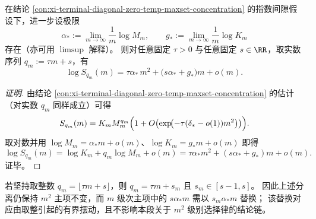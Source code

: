 \begin{conclusion}[双尺度对角矩展开：\texorpdfstring{$q=\tau m+s$}{q=tau m+s} 时 \texorpdfstring{$\log S_q(m)$}{log S_q(m)} 的 \(m^2+m\) 两级主项完全可分离]\label{con:xi-terminal-diagonal-logSq-m2-m-separation}
在结论 \ref{con:xi-terminal-diagonal-zero-temp-maxset-concentration} 的指数间隙假设下，进一步设极限
\[
\alpha_\ast:=\lim_{m\to\infty}\frac{1}{m}\log M_m,\qquad
g_\ast:=\lim_{m\to\infty}\frac{1}{m}\log K_m
\]
存在（亦可用 \(\limsup\) 解释）。
则对任意固定 \(\tau>0\) 与任意固定 \(s\in\RR\)，取实数序列 \(q_m:=\tau m+s\)，有
\[
\log S_{q_m}(m)=\tau\alpha_\ast\,m^2+\bigl(s\alpha_\ast+g_\ast\bigr)m+o(m).
\]
\end{conclusion}
\begin{proof}[证明]
由结论 \ref{con:xi-terminal-diagonal-zero-temp-maxset-concentration} 的估计（对实数 \(q_m\) 同样成立）可得
\[
S_{q_m}(m)=K_m M_m^{q_m}\Bigl(1+O\bigl(\exp\!\bigl(-\tau(\delta_\ast-o(1))m^2\bigr)\bigr)\Bigr).
\]
取对数并用 \(\log M_m=\alpha_\ast m+o(m)\)、\(\log K_m=g_\ast m+o(m)\) 即得
\[
\log S_{q_m}(m)=\log K_m+q_m\log M_m+o(m)
=\tau\alpha_\ast m^2+(s\alpha_\ast+g_\ast)m+o(m).
\]
证毕。
\end{proof}

\begin{remark}[关于整数化 \texorpdfstring{$q_m=\lfloor\tau m+s\rfloor$}{q=floor(tau m+s)} 的次主项]
若坚持取整数 \(q_m=\lfloor\tau m+s\rfloor\)，则 \(q_m=\tau m+s_m\) 且 \(s_m\in[s-1,s]\)。
因此上述分离仍保持 \(m^2\) 主项不变，而 \(m\) 级次主项中的 \(s\alpha_\ast m\) 需以 \(s_m\alpha_\ast m\) 替换；
该替换对应由取整引起的有界摆动，且不影响本段关于 \(m^2\) 级别选择律的结论链。
\end{remark}

